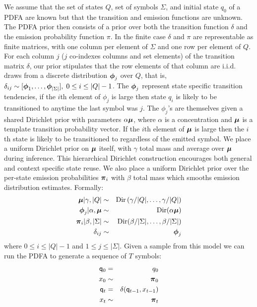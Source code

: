 We assume that the set of states $Q$, set of symbols $\Sigma$, and initial state $q_0$ of a PDFA are known but that the transition and emission functions are unknown.  The PDFA prior then consists of a prior over both the transition function $\delta$ and the emission probability function $\pi$.  In the finite case $\delta$ and $\pi$ are representable as finite matrices, with one column per element of $\Sigma$ and one row per element of $Q$.  For each column $j$ ($j$ co-indexes columns and set elements) of the transition matrix $\delta$, our prior stipulates that the row elements of that column are  i.i.d. draws from a discrete distribution $\bphi_j$ over $Q$, that is, $\delta_{ij} \sim [\bphi_1,\ldots,\bphi_{|\Sigma|}], \; 0 \leq i\leq|Q|-1$.  The $\bphi_j$ represent state specific transition tendencies, if the $i$th element of $\phi_{j}$ is large then state $q_i$ is likely to be transitioned to anytime the last symbol was $j.$   The $\phi_{j}$'s are   themselves given a shared Dirichlet prior with parameters $\alpha\bmu$, where $\alpha$ is a concentration and $\bmu$ is a template transition probability vector.   If the $i$th element of $\bmu$ is large then the $i$th state is likely to be transitioned to regardless of the emitted symbol.  We place a uniform Dirichlet prior on $\bmu$ itself, with $\gamma$ total mass and average over $\bmu$ during inference.  This hierarchical Dirichlet construction encourages both general and context specific state reuse.
 We also place a uniform Dirichlet prior over the per-state emission probabilities $\bpi_i$ with $\beta$ total mass which smooths emission distribution estimates.  Formally:
%
\begin{eqnarray}
\bmu|\gamma,|Q| & \sim & \mathrm{Dir}\left(\gamma/|Q|,\ldots,\gamma/|Q|\right) \label{gen:mu}  \\
\bphi_{j}|\alpha,\bmu  & \sim & \mathrm{Dir}(\alpha\bmu) \label{gen:phi} \\
\bpi_{i}|\beta,|\Sigma| & \sim & \mathrm{Dir}(\beta/|\Sigma|,\ldots,\beta/|\Sigma|) \label{gen:pi} \nonumber \\
\delta_{ij} & \sim & \bphi_{j} \label{gen:delta} \nonumber
\end{eqnarray}
%
where $0 \leq i \leq |Q|-1$ and $1 \leq j \leq |\Sigma|$.  Given a sample from this model we can run the PDFA to generate a sequence of $T$ symbols:
%
\begin{eqnarray}
\q_0 & = & q_0 \label{gen:q0} \nonumber \\
x_0 & \sim & \bpi_0 \label{gen:x0} \nonumber \\
\q_t & = & \delta(\q_{t-1},x_{t-1}) \label{gen:q} \nonumber \\
x_t & \sim & \bpi_t \label{gen:x} \nonumber
\end{eqnarray}
